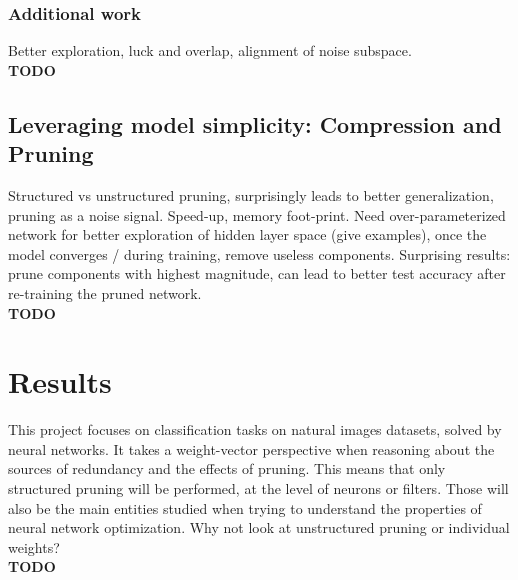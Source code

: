 \subsubsection*{Additional work}
Better exploration, luck and overlap, alignment of noise subspace. \\

\textbf{TODO}

\subsection{Leveraging model simplicity: Compression and Pruning}
Structured vs unstructured pruning, surprisingly leads to better generalization, pruning as a noise signal. Speed-up, memory foot-print. Need over-parameterized network for better exploration of hidden layer space (give examples), once the model converges / during training, remove useless components. Surprising results: prune components with highest magnitude, can lead to better test accuracy after re-training the pruned network. \\

\textbf{TODO}

\section{Results}

This project focuses on classification tasks on natural images datasets, solved by neural networks. It takes a weight-vector perspective when reasoning about the sources of redundancy and the effects of pruning. This means that only structured pruning will be performed, at the level of neurons or filters. Those will also be the main entities studied when trying to understand the properties of neural network optimization. Why not look at unstructured pruning or individual weights? \\

\textbf{TODO}


